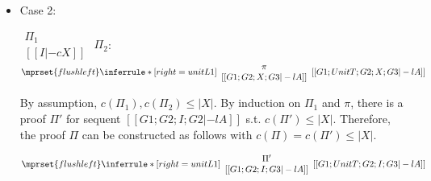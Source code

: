 \begin{itemize}
\item Case 2:
      \begin{center}
        \scriptsize
        \begin{math}
          \begin{array}{c}
            \Pi_1 \\
            {[[I |-c X]]}
          \end{array}
        \end{math}
        \qquad\qquad
        $\Pi_2$:
        \begin{math}
          $$\mprset{flushleft}
          \inferrule* [right={\tiny unitL1}] {
            {
              \begin{array}{c}
                \pi \\
                {[[G1; G2; X; G3 |-l A]]}
              \end{array}
            }
          }{[[G1; UnitT; G2; X; G3 |-l A]]}
        \end{math}
      \end{center}
      By assumption, $c(\Pi_1),c(\Pi_2)\leq |X|$. By induction on $\Pi_1$
      and $\pi$, there is a proof $\Pi'$ for sequent
      $[[G1; G2; I; G2 |-l A]]$
      s.t. $c(\Pi') \leq |X|$. Therefore, the proof $\Pi$ can be
      constructed as follows with $c(\Pi) = c(\Pi') \leq |X|$.
      \begin{center}
        \scriptsize
        \begin{math}
          $$\mprset{flushleft}
          \inferrule* [right={\tiny unitL1}] {
            {
              \begin{array}{c}
                \Pi' \\
                {[[G1; G2; I; G3 |-l A]]}
              \end{array}
            }
          }{[[G1; UnitT; G2; I; G3 |-l A]]}
        \end{math}
      \end{center}


\end{itemize}

